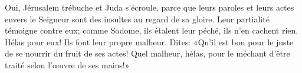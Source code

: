 Oui, Jérusalem trébuche et Juda s’écroule,
	parce que leurs paroles et leurs actes envers le Seigneur
		sont des insultes au regard de sa gloire.
Leur partialité témoigne contre eux;
	comme Sodome, ils étalent leur péché, ils n’en cachent rien.
	Hélas pour eux! Ils font leur propre malheur.
Dites: «Qu’il est bon pour le juste de se nourrir du fruit de ses actes!
	Quel malheur, hélas, pour le méchant
	d’être traité selon l’œuvre de ses mains!»
